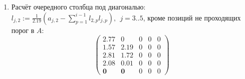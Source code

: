 \begin{multicols}{3}
\begin{enumerate}
    \item Расчёт очередного столбца под диагональю:$l_{j,2} := \frac{1}{2.19}(a_{j,2} - \sum_{p=1}^{i-1}l_{2,p}l_{j,p}),~~j=3..5$, кроме позиций не проходящих порог в $A$:
    $$\begin{pmatrix}
        2.77 & 0          & 0 & 0 & 0 \\
        1.57 & 2.19       & 0 & 0 & 0 \\
        2.81 & 1.72       & 0 & 0 & 0 \\
        2.08 & 0.01       & 0 & 0 & 0 \\
         \mathbf{0}    & \mathbf{0} & 0 & 0 & 0
    \end{pmatrix}$$
\end{enumerate}
\end{multicols}

\clearpage


